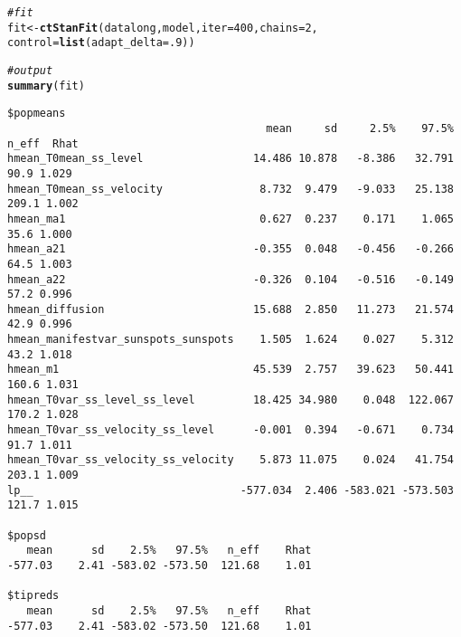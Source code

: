 \documentclass[nojss]{jss}\usepackage[]{graphicx}\usepackage[]{color}
\makeatletter
\newcommand{\hlnum}[1]{\textcolor[rgb]{0.686,0.059,0.569}{#1}}%
\newcommand{\hlcom}[1]{\textcolor[rgb]{0.678,0.584,0.686}{\textit{#1}}}%
\newcommand{\hlstd}[1]{\textcolor[rgb]{0.345,0.345,0.345}{#1}}%
\newcommand{\hlkwb}[1]{\textcolor[rgb]{0.69,0.353,0.396}{#1}}%
\newcommand{\hlkwc}[1]{\textcolor[rgb]{0.333,0.667,0.333}{#1}}%
\newcommand{\hlkwd}[1]{\textcolor[rgb]{0.737,0.353,0.396}{\textbf{#1}}}%
\newenvironment{kframe}{%
 \def\at@end@of@kframe{}%
 \ifinner\ifhmode%
  \def\at@end@of@kframe{\end{minipage}}%
  \begin{minipage}{\columnwidth}%
 \fi\fi%
 \def\FrameCommand##1{\hskip\@totalleftmargin \hskip-\fboxsep
 \colorbox{shadecolor}{##1}\hskip-\fboxsep
     \hskip-\linewidth \hskip-\@totalleftmargin \hskip\columnwidth}%
 \MakeFramed {\advance\hsize-\width
   \@totalleftmargin\z@ \linewidth\hsize
   \@setminipage}}%
 {\par\unskip\endMakeFramed%
 \at@end@of@kframe}
\newenvironment{knitrout}{}{} %
\makeatother
\begin{document}
\begin{knitrout}
\begin{kframe}
\begin{alltt}
\hlcom{#fit}
\hlstd{fit} \hlkwb{<-} \hlkwd{ctStanFit}\hlstd{(datalong, model,} \hlkwc{iter}\hlstd{=}\hlnum{400}\hlstd{,} \hlkwc{chains}\hlstd{=}\hlnum{2}\hlstd{,}
  \hlkwc{control}\hlstd{=}\hlkwd{list}\hlstd{(}\hlkwc{adapt_delta}\hlstd{=}\hlnum{.9}\hlstd{))}

\hlcom{#output}
\hlkwd{summary}\hlstd{(fit)}
\end{alltt}
\begin{verbatim}
$popmeans
                                        mean     sd     2.5%    97.5% n_eff  Rhat
hmean_T0mean_ss_level                 14.486 10.878   -8.386   32.791  90.9 1.029
hmean_T0mean_ss_velocity               8.732  9.479   -9.033   25.138 209.1 1.002
hmean_ma1                              0.627  0.237    0.171    1.065  35.6 1.000
hmean_a21                             -0.355  0.048   -0.456   -0.266  64.5 1.003
hmean_a22                             -0.326  0.104   -0.516   -0.149  57.2 0.996
hmean_diffusion                       15.688  2.850   11.273   21.574  42.9 0.996
hmean_manifestvar_sunspots_sunspots    1.505  1.624    0.027    5.312  43.2 1.018
hmean_m1                              45.539  2.757   39.623   50.441 160.6 1.031
hmean_T0var_ss_level_ss_level         18.425 34.980    0.048  122.067 170.2 1.028
hmean_T0var_ss_velocity_ss_level      -0.001  0.394   -0.671    0.734  91.7 1.011
hmean_T0var_ss_velocity_ss_velocity    5.873 11.075    0.024   41.754 203.1 1.009
lp__                                -577.034  2.406 -583.021 -573.503 121.7 1.015

$popsd
   mean      sd    2.5%   97.5%   n_eff    Rhat 
-577.03    2.41 -583.02 -573.50  121.68    1.01 

$tipreds
   mean      sd    2.5%   97.5%   n_eff    Rhat 
-577.03    2.41 -583.02 -573.50  121.68    1.01 
\end{verbatim}
\end{kframe}
\end{knitrout}
\end{document}
